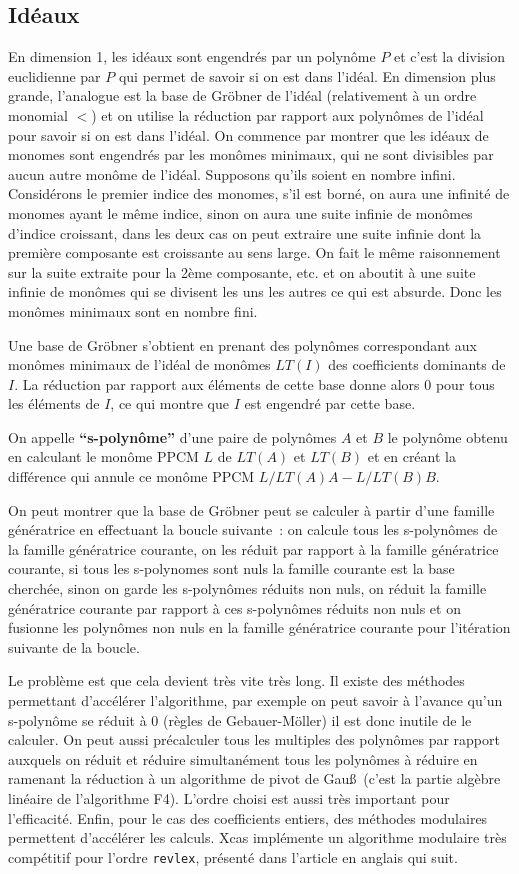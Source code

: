 \documentclass[a4paper,11pt]{article}
\begin{document}
\subsection{Idéaux}
En dimension 1, les idéaux sont engendrés par un polynôme $P$ et
c'est la division euclidienne par $P$ qui permet de savoir si on est
dans l'idéal. En dimension plus grande, l'analogue est la base
de Gröbner de l'idéal (relativement à un ordre monomial $<$)
et on utilise la réduction par rapport aux polynômes de l'idéal
pour savoir si on est dans l'idéal.
On commence par montrer que les idéaux de monomes
sont engendrés par 
les monômes minimaux, qui ne sont divisibles par aucun
autre monôme de l'idéal. Supposons qu'ils soient en nombre infini.
Considérons le premier indice des monomes, s'il est borné, on 
aura une infinité de monomes ayant le même indice, sinon on
aura une suite infinie de monômes d'indice croissant, dans
les deux cas on peut extraire une suite infinie dont la première
composante est croissante au sens large. On fait le même
raisonnement sur la suite extraite pour la 2ème composante, etc.
et on aboutit à une suite infinie de monômes qui se divisent les
uns les autres ce qui est absurde. Donc les monômes minimaux
sont en nombre fini.

Une base de Gröbner s'obtient en prenant
des polynômes correspondant aux monômes minimaux 
de l'idéal de monômes $LT(I)$ 
des coefficients dominants de $I$. La réduction
par rapport aux éléments de cette base donne alors 0
pour tous les éléments de $I$, ce qui montre que
$I$ est engendré par cette base.

On appelle {\bf ``s-polynôme''} d'une paire de polynômes
$A$ et $B$
le polynôme obtenu en calculant le monôme PPCM $L$ de $LT(A)$ 
et $LT(B)$ et en créant la différence
qui annule ce monôme PPCM $L/LT(A)A -L/LT(B)B$.

On peut montrer que la base de Gröbner peut se calculer
à partir d'une famille génératrice en effectuant
la boucle suivante~:
on calcule tous les s-polynômes de la famille génératrice
courante, on les réduit par rapport à la famille génératrice
courante, si tous les s-polynomes sont nuls la famille
courante est la base cherchée, sinon 
on garde les s-polynômes réduits non nuls, on réduit
la famille génératrice courante par rapport à ces s-polynômes réduits
non nuls et on fusionne les polynômes non nuls en la famille
génératrice courante pour l'itération suivante de la boucle.

Le problème est que cela devient très vite très long. Il existe
des méthodes permettant d'accélérer l'algorithme, par exemple
on peut savoir à l'avance qu'un s-polynôme se réduit à 0
(règles de Gebauer-Möller) il est donc inutile de le calculer.
On peut aussi précalculer tous les multiples des polynômes
par rapport auxquels on réduit et réduire simultanément
tous les polynômes à réduire en ramenant la réduction
à un algorithme de pivot de Gau\ss\ (c'est la partie
algèbre linéaire de l'algorithme F4). L'ordre choisi
est aussi très important pour l'efficacité. Enfin, pour le cas des
coefficients entiers, des méthodes modulaires permettent
d'accélérer les calculs. Xcas implémente un algorithme modulaire
très compétitif pour l'ordre {\tt revlex}, présenté
dans l'article en anglais qui suit.
\end{document}
